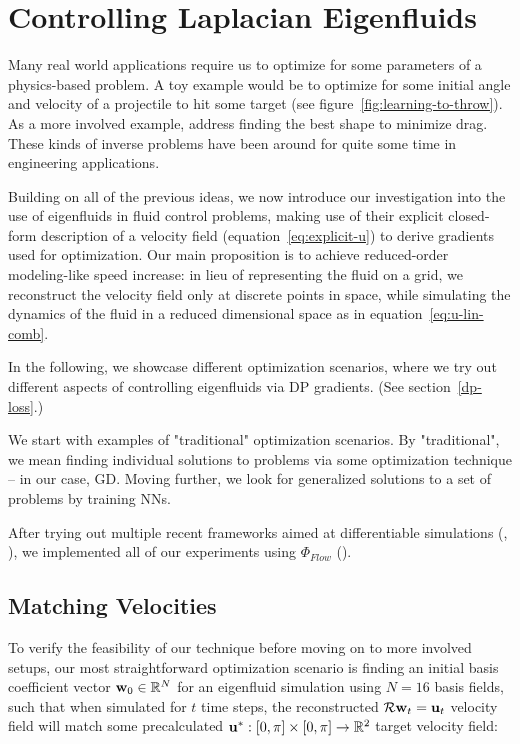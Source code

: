 \chapter{Controlling Laplacian Eigenfluids}
\label{chapter:controlling-laplacian-eigenfluids}
Many real world applications require us to optimize for some parameters of
a physics-based problem. A toy example would be to optimize for some initial
angle and velocity of a projectile to hit some target (see
figure~\ref{fig:learning-to-throw}). As a more involved example, \cite{MinDrag}
address finding the best shape to minimize drag. These kinds of inverse problems
have been around for quite some time in engineering applications.

Building on all of the previous ideas, we now introduce our investigation into
the use of eigenfluids in fluid control problems, making use of their explicit
closed-form description of a velocity field (equation~\eqref{eq:explicit-u}) to
derive gradients used for optimization. Our main proposition is to achieve
reduced-order modeling-like speed increase: in lieu of representing the fluid on
a grid, we reconstruct the velocity field only at discrete points in space,
while simulating the dynamics of the fluid in a reduced dimensional
space as in equation~\eqref{eq:u-lin-comb}.

In the following, we showcase different optimization scenarios, where we try out
different aspects of controlling eigenfluids via \acf{DP} gradients. (See
section~\ref{dp-loss}.)

We start with examples of "traditional" optimization scenarios. By
"traditional", we mean finding individual solutions to problems via some
optimization technique -- in our case, \acf{GD}. Moving further, we look for
generalized solutions to a set of problems by training \acfp{NN}.

After trying out multiple recent frameworks aimed at differentiable simulations
(\cite{warp2022}, \cite{difftaichi}), we implemented all of our experiments
using $\Phi_{Flow}$ (\cite{holl2019pdecontrol}).

\section{Matching Velocities}\label{section:matching-velocities}
To verify the feasibility of our technique before moving on to more involved
setups, our most straightforward optimization scenario is finding an initial
basis coefficient vector $\vb{w}_0 \in \mathbb{R}^N$ for an eigenfluid
simulation using $N=16$ basis fields, such that when simulated for $t$ time
steps, the reconstructed $\mathcal{R}\vb{w}_t = \vb{u}_t$ velocity
field will match some precalculated $\vb{u}^*: [0,\pi]\times[0,\pi] \to
\mathbb{R}^2$ target velocity field:

